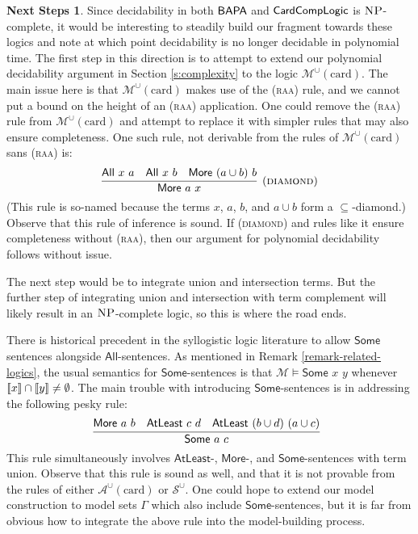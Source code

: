 \documentclass[letterpaper]{article} %
\theoremstyle{definition}
\newtheorem*{nextsteps*}{Next Steps}
\newcommand{\semantics}[1]{[\![\mbox{\em $ #1 $\/}]\!]}
\newcommand{\Model}{\mathcal{M}}
\newcommand{\rem}[1]{\relax}
\newcommand{\Aunion}{\mathscr{A}^{\cup}}
\newcommand{\Munion}{\mathscr{M}^{\cup}}
\newcommand{\Sunion}{\mathscr{S}^{\cup}}
\newcommand{\BAPA}{\sf{BAPA}}
\newcommand{\CardCompLogic}{\sf{CardCompLogic}}
\newcommand{\proverule}{\textsc}
\newcommand{\raa}{\proverule{raa}}
\newcommand{\NP}{\textsc{NP}}
\newcommand{\All}[2]{\mathsf{All}\,\,#1\,\,#2}
\newcommand{\Some}[2]{\mathsf{Some}\,\,#1\,\,#2}
\newcommand{\Atleast}[2]{\mathsf{AtLeast}\,\,#1\,\,#2}
\newcommand{\More}[2]{\mathsf{More}\,\,#1\,\,#2}
\newcommand{\AllNoArgs}{\mathsf{All}}
\newcommand{\SomeNoArgs}{\mathsf{Some}}
\newcommand{\AtleastNoArgs}{\mathsf{AtLeast}}
\newcommand{\MoreNoArgs}{\mathsf{More}}
\newcommand{\card}{\mathrm{card}}
\newcommand{\noproof}{\rem}
\begin{document}
\begin{nextsteps*}
Since decidability in both $\BAPA$ and $\CardCompLogic$ is $\NP$-complete, it would be interesting to steadily build our fragment towards these logics and note at which point decidability is no longer decidable in polynomial time.  The first step in this direction is to attempt to extend our polynomial decidability argument in Section \ref{s:complexity} to the logic $\Munion(\card)$.  The main issue here is that $\Munion(\card)$ makes use of the (\raa) rule, and we cannot put a bound on the height of an (\raa) application.  One could remove the (\raa) rule from $\Munion(\card)$ and attempt to replace it with simpler rules that may also ensure completeness.  One such rule, not derivable from the rules of $\Munion(\card)$ sans (\raa) is:
\[
\infer[(\proverule{diamond})]
    {\More{a}{x}}
    {\All{x}{a} & \All{x}{b} & \More{(a \cup b)}{b}}
\]
(This rule is so-named because the terms $x$, $a$, $b$, and $a \cup b$ form a $\subseteq$-diamond.)
\noproof{To see that this rule of inference is sound, suppose $\Gamma \models \All{x}{a}$, $\Gamma \models \All{x}{b}$, and $\Gamma \models \More{(a \cup b)}{b}$.  Since $\Gamma \models \More{(a \cup b)}{b}$, there must be an element of $\semantics{a}$ not in $\semantics{b}$.  Since $\semantics{x} \subseteq \semantics{b}$, this element is not in $\semantics{x}$ either.  So $\semantics{x}$ must be a proper subset of $\semantics{a}$.  But then $\Gamma \models \More{a}{x}$.
}
Observe that this rule of inference is sound.  If (\proverule{diamond}) and rules like it ensure completeness without (\raa), then our argument for polynomial decidability follows without issue.

The next step would be to integrate union and intersection terms. %
But the further step of integrating union and intersection with term complement will likely result in an $\NP$-complete logic, so this is where the road ends.


There is historical precedent in the syllogistic logic
literature to allow $\SomeNoArgs$ sentences alongside
$\AllNoArgs$-sentences.   As mentioned in Remark \ref{remark-related-logics}, the usual semantics for $\SomeNoArgs$-sentences is that $\Model \models \Some{x}{y}$ whenever $\semantics{x} \cap \semantics{y} \ne \emptyset$.
The main trouble with introducing $\SomeNoArgs$-sentences is in addressing the following pesky rule:
\[
\infer[]
    {\Some{a}{c}}
    {\More{a}{b} & \Atleast{c}{d} & \Atleast{(b \cup d)}{(a \cup c)}}
\]
This rule simultaneously involves $\AtleastNoArgs$-, $\MoreNoArgs$-, and $\SomeNoArgs$-sentences with term union.
Observe that this rule is sound as well, and that it is not provable from the rules of either $\Aunion(\card)$ or $\Sunion$.
One could hope to extend our model construction to model sets $\Gamma$ which also include $\SomeNoArgs$-sentences, but it is far from obvious how to integrate the above rule into the model-building process.


\end{nextsteps*}
\end{document}
